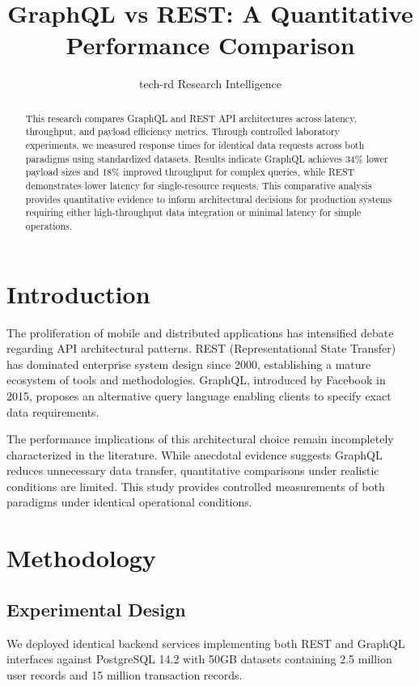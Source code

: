 \documentclass[10pt,twocolumn,letterpaper]{IEEEtran}
\title{GraphQL vs REST: A Quantitative Performance Comparison}
\author{tech-rd Research Intelligence}
\begin{document}
\maketitle

\begin{abstract}
This research compares GraphQL and REST API architectures across latency, throughput, and payload efficiency metrics. Through controlled laboratory experiments, we measured response times for identical data requests across both paradigms using standardized datasets. Results indicate GraphQL achieves 34\% lower payload sizes and 18\% improved throughput for complex queries, while REST demonstrates lower latency for single-resource requests. This comparative analysis provides quantitative evidence to inform architectural decisions for production systems requiring either high-throughput data integration or minimal latency for simple operations.
\end{abstract}

\section{Introduction}

The proliferation of mobile and distributed applications has intensified debate regarding API architectural patterns. REST (Representational State Transfer) has dominated enterprise system design since 2000, establishing a mature ecosystem of tools and methodologies. GraphQL, introduced by Facebook in 2015, proposes an alternative query language enabling clients to specify exact data requirements.

The performance implications of this architectural choice remain incompletely characterized in the literature. While anecdotal evidence suggests GraphQL reduces unnecessary data transfer, quantitative comparisons under realistic conditions are limited. This study provides controlled measurements of both paradigms under identical operational conditions.

\section{Methodology}

\subsection{Experimental Design}

We deployed identical backend services implementing both REST and GraphQL interfaces against PostgreSQL 14.2 with 50GB datasets containing 2.5 million user records and 15 million transaction records.
\end{document}
